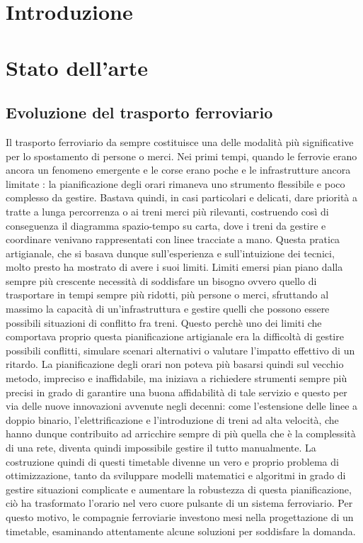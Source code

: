 \documentclass[a4paper,12pt]{report}
\begin{document}
\chapter*{Introduzione}


\chapter{Stato dell’arte}

\section{Evoluzione del trasporto ferroviario}
Il trasporto ferroviario da sempre costituisce una delle modalità più significative per lo spostamento di persone o merci. Nei primi tempi, quando le ferrovie erano ancora un fenomeno emergente e le corse erano poche e le infrastrutture ancora limitate : la pianificazione degli orari rimaneva uno strumento flessibile e poco complesso da gestire. Bastava quindi, in casi particolari e delicati, dare priorità a tratte a lunga percorrenza o ai treni merci più rilevanti, costruendo così di conseguenza il diagramma spazio-tempo su carta, dove i treni da gestire e coordinare venivano rappresentati con linee tracciate a mano. Questa pratica artigianale, che si basava dunque sull'esperienza e sull'intuizione dei tecnici, molto presto ha mostrato di avere i suoi limiti. Limiti emersi pian piano dalla sempre più crescente necessità di soddisfare un bisogno ovvero quello di trasportare in tempi sempre più ridotti, più persone o merci, sfruttando al massimo la capacità di un'infrastruttura e gestire quelli che possono essere possibili situazioni di conflitto fra treni.
Questo perchè uno dei limiti che comportava proprio questa pianificazione artigianale era la difficoltà di gestire possibili conflitti, simulare scenari alternativi o valutare l’impatto effettivo di un ritardo. 
La pianificazione degli orari non poteva più basarsi quindi sul vecchio metodo, impreciso e inaffidabile, ma iniziava a richiedere strumenti sempre più precisi in grado di garantire una buona affidabilità di tale servizio e questo per via delle nuove innovazioni avvenute negli decenni: come l'estensione delle linee a doppio binario, l'elettrificazione e l'introduzione di treni ad alta velocità, che hanno dunque contribuito ad arricchire sempre di più quella che è la complessità di una rete, diventa quindi impossibile gestire il tutto manualmente. La costruzione quindi di questi timetable divenne un vero e proprio problema di ottimizzazione, tanto da sviluppare modelli matematici e algoritmi in grado di gestire situazioni complicate e aumentare la robustezza di questa pianificazione, ciò ha trasformato l'orario nel vero cuore pulsante di un sistema ferroviario.
Per questo motivo, le compagnie ferroviarie investono mesi nella progettazione di un timetable, esaminando attentamente alcune soluzioni per soddisfare la domanda.
\end{document}
